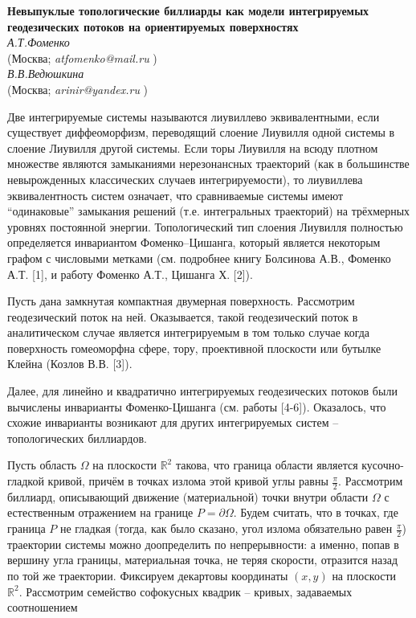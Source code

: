 \begin{center}{ \bf  Невыпуклые топологические биллиарды как модели интегрируемых геодезических потоков на ориентируемых поверхностях}\\
{\it А.Т.Фоменко } \\
(Москва; {\it atfomenko@mail.ru} )\\
{\it В.В.Ведюшкина } \\
(Москва; {\it arinir@yandex.ru} )

\end{center}


Две интегрируемые системы называются лиувиллево эквивалентными, если существует диффеоморфизм, переводящий
слоение Лиувилля одной системы в слоение Лиувилля другой системы. Если
торы Лиувилля на всюду плотном множестве являются замыканиями нерезонансных траекторий (как в большинстве невырожденных  классических случаев интегрируемости), то лиувиллева эквивалентность систем означает, что сравниваемые системы имеют ``одинаковые'' замыкания решений (т.е. интегральных траекторий) на трёхмерных уровнях постоянной энергии.   Топологический тип слоения Лиувилля
полностью определяется инвариантом Фоменко--Цишанга, который является
некоторым графом с числовыми метками (см. подробнее книгу Болсинова А.В., Фоменко А.Т. [1], и работу Фоменко А.Т., Цишанга Х. [2]).

 Пусть дана замкнутая компактная  двумерная поверхность. Рассмотрим геодезический поток на ней. Оказывается, такой геодезический поток в аналитическом случае является интегрируемым в том только случае когда поверхность гомеоморфна сфере, тору, проективной плоскости или бутылке Клейна (Козлов В.В. [3]).

 Далее, для линейно и квадратично  интегрируемых геодезических потоков   были вычислены   инварианты Фоменко-Цишанга (см. работы [4-6]). Оказалось, что схожие инварианты возникают для других интегрируемых систем -- топологических биллиардов.


Пусть  область $\Omega$  на плоскости $\mathbb{R}^2$  такова, что граница области является кусочно-гладкой кривой, причём в точках излома этой кривой углы равны $\frac{\pi}{2}$.
Рассмотрим биллиард, описывающий движение (материальной) точки внутри области $\Omega$ с
естественным отражением на границе $P=\partial \Omega$.    Будем считать, что в точках,
где граница $P$ не гладкая
(тогда, как было сказано,  угол излома обязательно равен $\frac{\pi}{2}$)
 траектории системы можно доопределить по непрерывности: а именно, попав в вершину угла границы, материальная точка, не теряя скорости, отразится назад по той же траектории.
 Фиксируем декартовы координаты $(x,y)$ на плоскости $\mathbb{R}^2.$ Рассмотрим семейство софокусных квадрик -- кривых,  задаваемых соотношением

